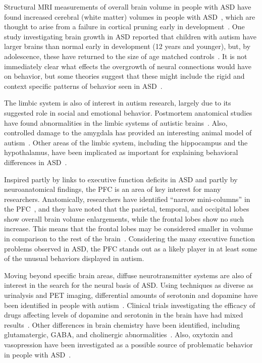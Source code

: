 Structural MRI measurements of overall brain volume in people with ASD have found increased cerebral (white matter) volumes in people with ASD~\cite{FilipekPA:1995:AutismCerebellumMRI}, which are thought to arise from a failure in cortical pruning early in development~\cite{Eigsti:2003:AutismNeuroReview}. One study investigating brain growth in ASD reported that children with autism have larger brains than normal early in development (12 years and younger), but, by adolescence, these have returned to the size of age matched controls~\cite{RefWorks:142}. It is not immediately clear what effects the overgrowth of neural connections would have on behavior, but some theories suggest that these might include the rigid and context specific patterns of behavior seen in ASD~\cite{CohenIL:1994:AutismLearning}.

The limbic system is also of interest in autism research, largely due to its suggested role in social and emotional behavior. Postmortem anatomical studies have found abnormalities in the limbic systems of autistic brains~\cite{RefWorks:133}. Also, controlled damage to the amygdala has provided an interesting animal model of autism~\cite{BachevalierJ:1994:AutismAnimalModel}. Other areas of the limbic system, including the hippocampus and the hypothalamus, have been implicated as important for explaining behavioral differences in ASD~\cite{RefWorks:133}. 

Inspired partly by links to executive function deficits in ASD and partly by neuroanatomical findings, the PFC is an area of key interest for many researchers. Anatomically, researchers have identified ``narrow mini-columns'' in the PFC~\cite{Casanova:2003:AutismMiniColumns}, and they have noted that the parietal, temporal, and occipital lobes show overall brain volume enlargements, while the frontal lobes show no such increase. This means that the frontal lobes may be considered smaller in volume in comparison to the rest of the brain~\cite{PivenJ:1996:AutismBrainBig}. Considering the many executive function problems observed in ASD, the PFC stands out as a likely player in at least some of the unusual behaviors displayed in autism.

Moving beyond specific brain areas, diffuse neurotransmitter systems are also of interest in the search for the neural basis of ASD. Using techniques as diverse as urinalysis and PET imaging, differential amounts of serotonin and dopamine have been identified in people with autism~\cite{FernellE:1997:AutismPET,MartineauJ:1992:AutismDopamine,PoseyDJ:2000:AutismDopamine,RefWorks:72}. Clinical trials investigating the efficacy of drugs affecting levels of dopamine and serotonin in the brain have had mixed results~\cite{MartineauJ:1992:AutismDopamine,PoseyDJ:2000:AutismDopamine,Chugani:2004:AutismSerotonin}. Other differences in brain chemistry have been identified, including glutamatergic, GABA, and cholinergic abnormalities~\cite{RefWorks:95,RefWorks:96,RefWorks:137}. Also, oxytoxin and vasopression have been investigated as a possible source of problematic behavior in people with ASD~\cite{RefWorks:95,RefWorks:75}.

